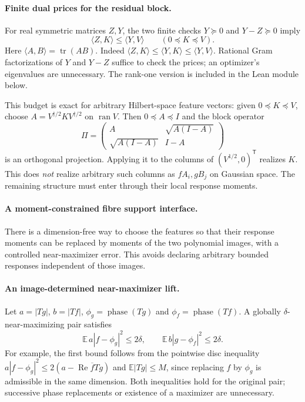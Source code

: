 \paragraph{Finite dual prices for the residual block.}
For real symmetric matrices $Z,Y$, the two finite checks
$Y\succeq0$ and $Y-Z\succeq0$ imply
\begin{equation}\label{eq:shared-gram-price}
 \langle Z,K\rangle\le\langle Y,V\rangle
 \qquad(0\preceq K\preceq V).
\end{equation}
Here $\langle A,B\rangle=\operatorname{tr}(AB)$. Indeed
$\langle Z,K\rangle\le\langle Y,K\rangle\le\langle Y,V\rangle$.
Rational Gram factorizations of $Y$ and $Y-Z$ suffice to check the prices;
an optimizer's eigenvalues are unnecessary. The rank-one version is included
in the Lean module below.

This budget is exact for arbitrary Hilbert-space feature vectors: given
$0\preceq K\preceq V$, choose $A=V^{\dagger/2}KV^{\dagger/2}$ on
$\operatorname{ran}V$. Then $0\preceq A\preceq I$ and the block operator
\[
 \Pi=\begin{pmatrix}A&\sqrt{A(I-A)}\\
                      \sqrt{A(I-A)}&I-A\end{pmatrix}
\]
is an orthogonal projection. Applying it to the columns of
$(V^{1/2},0)^{\mathsf T}$ realizes $K$. This does \emph{not} realize
arbitrary such columns as $fA_i,gB_j$ on Gaussian space. The remaining
structure must enter through their local response moments.

\paragraph{A moment-constrained fibre support interface.}
There is a dimension-free way to choose the features so that their response
moments can be replaced by moments of the two polynomial images, with a
controlled near-maximizer error. This avoids declaring arbitrary bounded
responses independent of those images.

\paragraph{An image-determined near-maximizer lift.}
Let $a=|Tg|$, $b=|Tf|$, $\phi_g=\operatorname{phase}(Tg)$ and
$\phi_f=\operatorname{phase}(Tf)$. A globally $\delta$-near-maximizing pair
satisfies
\begin{equation}\label{eq:shared-weighted-alignment}
 \mathbb E\,a|f-\phi_g|^2\le2\delta,\qquad
 \mathbb E\,b|g-\phi_f|^2\le2\delta.
\end{equation}
For example, the first bound follows from the pointwise disc inequality
$a|f-\phi_g|^2\le2(a-\operatorname{Re}\overline f Tg)$ and
$\mathbb E|Tg|\le M$, since replacing $f$ by $\phi_g$ is admissible in
the same dimension. Both inequalities hold for the original pair; successive
phase replacements or existence of a maximizer are unnecessary.

